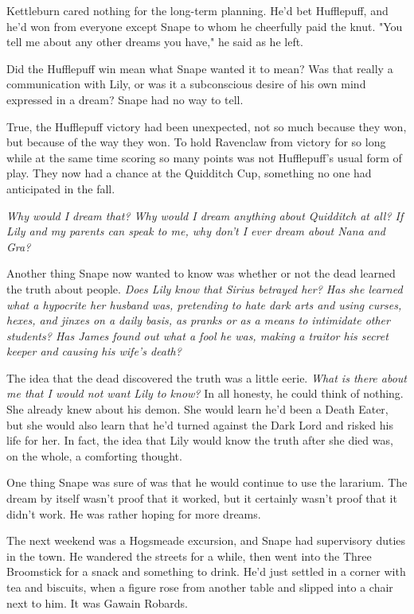 Kettleburn cared nothing for the long-term planning. He'd bet Hufflepuff, and he'd won from everyone except Snape to whom he cheerfully paid the knut. "You tell me about any other dreams you have," he said as he left.

Did the Hufflepuff win mean what Snape wanted it to mean? Was that really a communication with Lily, or was it a subconscious desire of his own mind expressed in a dream? Snape had no way to tell.

True, the Hufflepuff victory had been unexpected, not so much because they won, but because of the way they won. To hold Ravenclaw from victory for so long while at the same time scoring so many points was not Hufflepuff's usual form of play. They now had a chance at the Quidditch Cup, something no one had anticipated in the fall.

\emph{Why would I dream that? Why would I dream anything about Quidditch at all? If Lily and my parents can speak to me, why don't I ever dream about Nana and Gra?}

Another thing Snape now wanted to know was whether or not the dead learned the truth about people. \emph{Does Lily know that Sirius betrayed her? Has she learned what a hypocrite her husband was, pretending to hate dark arts and using curses, hexes, and jinxes on a daily basis, as pranks or as a means to intimidate other students? Has James found out what a fool he was, making a traitor his secret keeper and causing his wife's death?}

The idea that the dead discovered the truth was a little eerie. \emph{What is there about me that I would not want Lily to know?} In all honesty, he could think of nothing. She already knew about his demon. She would learn he'd been a Death Eater, but she would also learn that he'd turned against the Dark Lord and risked his life for her. In fact, the idea that Lily would know the truth after she died was, on the whole, a comforting thought.

One thing Snape was sure of was that he would continue to use the lararium. The dream by itself wasn't proof that it worked, but it certainly wasn't proof that it didn't work. He was rather hoping for more dreams.

The next weekend was a Hogsmeade excursion, and Snape had supervisory duties in the town. He wandered the streets for a while, then went into the Three Broomstick for a snack and something to drink. He'd just settled in a corner with tea and biscuits, when a figure rose from another table and slipped into a chair next to him. It was Gawain Robards.

